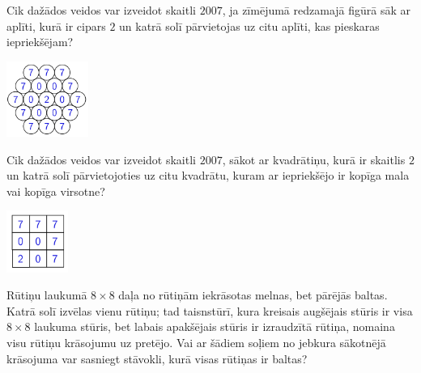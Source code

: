 \documentclass[11pt]{article}
\begin{document}
\begin{problem}[EE.PK.2007.8.TEST.6]
Cik dažādos veidos var izveidot skaitli $2007$, ja 
zīmējumā redzamajā figūrā sāk ar aplīti, kurā ir cipars $2$ un 
katrā solī pārvietojas uz citu aplīti, kas pieskaras iepriekšējam? 
\begin{center}
\includegraphics[width=0.2\textwidth]{math-induction-junior-classes/EE-PK-2007-8-TEST-6.png}
\end{center}
\end{problem}


\begin{problem}[EE.PK.2007.9.TEST.6]
Cik dažādos veidos var izveidot skaitli $2007$, sākot ar kvadrātiņu, kurā 
ir skaitlis $2$ un katrā solī pārvietojoties uz citu kvadrātu, kuram ar iepriekšējo ir 
kopīga mala vai kopīga virsotne?
\begin{center}
\includegraphics[width=0.15\textwidth]{math-induction-junior-classes/EE-PK-2007-9-TEST-6.png}
\end{center}
\end{problem}

\begin{problem}[EE.PK.2008.9.3]
Rūtiņu laukumā $8 \times 8$ daļa no rūtiņām iekrāsotas 
melnas, bet pārējās \textendash{} baltas. Katrā solī izvēlas
vienu rūtiņu; tad taisnstūrī, kura kreisais augšējais stūris ir 
visa $8 \times 8$ laukuma stūris, bet labais apakšējais stūris 
ir izraudzītā rūtiņa, nomaina visu rūtiņu krāsojumu uz pretējo. 
Vai ar šādiem soļiem no jebkura sākotnējā krāsojuma var sasniegt
stāvokli, kurā visas rūtiņas ir baltas?
\end{problem}
\end{document}
